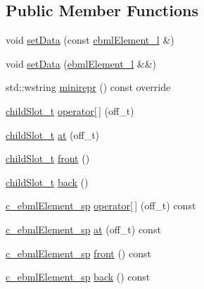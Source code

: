 \subsection*{Public Member Functions}
\begin{DoxyCompactItemize}
\item 
void \mbox{\hyperlink{classebml_1_1ebmlList_aa94bbf1188e309c806198c179dc57149}{set\+Data}} (const \mbox{\hyperlink{namespaceebml_a1ddadd26791f273d851882653b9caf70}{ebml\+Element\+\_\+l}} \&)
\item 
void \mbox{\hyperlink{classebml_1_1ebmlList_a4fe5b352155dd7180522e85ec7d7f865}{set\+Data}} (\mbox{\hyperlink{namespaceebml_a1ddadd26791f273d851882653b9caf70}{ebml\+Element\+\_\+l}} \&\&)
\item 
std\+::wstring \mbox{\hyperlink{classebml_1_1ebmlList_a49cf343c62058b121e7c546e8afa0947}{minirepr}} () const override
\item 
\mbox{\hyperlink{classebml_1_1childSlot__t}{child\+Slot\+\_\+t}} \mbox{\hyperlink{classebml_1_1ebmlList_a93db5aabab62f6761162e2add92cdda7}{operator\mbox{[}$\,$\mbox{]}}} (off\+\_\+t)
\item 
\mbox{\hyperlink{classebml_1_1childSlot__t}{child\+Slot\+\_\+t}} \mbox{\hyperlink{classebml_1_1ebmlList_af07f5e6d2e1e9d7f2f85c49447aefec1}{at}} (off\+\_\+t)
\item 
\mbox{\hyperlink{classebml_1_1childSlot__t}{child\+Slot\+\_\+t}} \mbox{\hyperlink{classebml_1_1ebmlList_a099cd0a5c21fb83a005638fa8990ae8c}{front}} ()
\item 
\mbox{\hyperlink{classebml_1_1childSlot__t}{child\+Slot\+\_\+t}} \mbox{\hyperlink{classebml_1_1ebmlList_a038cf53176c9e4cf80930e7deef86714}{back}} ()
\item 
\mbox{\hyperlink{namespaceebml_a2deef4e8071531b32e3533f1bf978917}{c\+\_\+ebml\+Element\+\_\+sp}} \mbox{\hyperlink{classebml_1_1ebmlList_ad1960e8d6774b85ab02b86981a661196}{operator\mbox{[}$\,$\mbox{]}}} (off\+\_\+t) const
\item 
\mbox{\hyperlink{namespaceebml_a2deef4e8071531b32e3533f1bf978917}{c\+\_\+ebml\+Element\+\_\+sp}} \mbox{\hyperlink{classebml_1_1ebmlList_aee4aa9a8875e80e6a6583d85e86fe7f5}{at}} (off\+\_\+t) const
\item 
\mbox{\hyperlink{namespaceebml_a2deef4e8071531b32e3533f1bf978917}{c\+\_\+ebml\+Element\+\_\+sp}} \mbox{\hyperlink{classebml_1_1ebmlList_add75b2ad61fe9f997df303872adc67da}{front}} () const
\item 
\mbox{\hyperlink{namespaceebml_a2deef4e8071531b32e3533f1bf978917}{c\+\_\+ebml\+Element\+\_\+sp}} \mbox{\hyperlink{classebml_1_1ebmlList_a3ae9e052dca738b1a3e66c9da0e47e76}{back}} () const

\end{DoxyCompactItemize}

